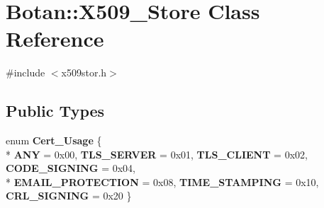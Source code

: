 \hypertarget{classBotan_1_1X509__Store}{\section{Botan\-:\-:X509\-\_\-\-Store Class Reference}
\label{classBotan_1_1X509__Store}
}


{\ttfamily \#include $<$x509stor.\-h$>$}

\subsection*{Public Types}
\begin{DoxyCompactItemize}
\item 
enum {\bfseries Cert\-\_\-\-Usage} \{ \\*
{\bfseries A\-N\-Y} = 0x00, 
{\bfseries T\-L\-S\-\_\-\-S\-E\-R\-V\-E\-R} = 0x01, 
{\bfseries T\-L\-S\-\_\-\-C\-L\-I\-E\-N\-T} = 0x02, 
{\bfseries C\-O\-D\-E\-\_\-\-S\-I\-G\-N\-I\-N\-G} = 0x04, 
\\*
{\bfseries E\-M\-A\-I\-L\-\_\-\-P\-R\-O\-T\-E\-C\-T\-I\-O\-N} = 0x08, 
{\bfseries T\-I\-M\-E\-\_\-\-S\-T\-A\-M\-P\-I\-N\-G} = 0x10, 
{\bfseries C\-R\-L\-\_\-\-S\-I\-G\-N\-I\-N\-G} = 0x20
 \}
\end{DoxyCompactItemize}
